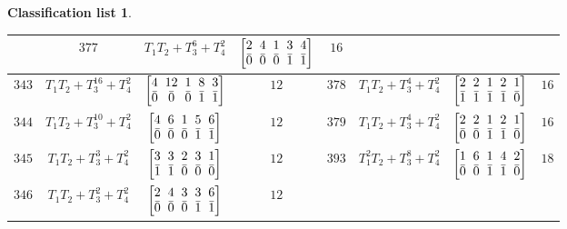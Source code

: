 \documentclass[pdftex]{sigma}%
\theoremstyle{definition}
\newtheorem{class-list}[thm]{Classification list}
\numberwithin{equation}{section}
\begin{document}
\begin{class-list}
\begin{table}[h!]
\begin{tabu}{c|c|c|c||c|c|c|c}
&${377}$&${T_{1}T_{2}+T_{3}^{6}+T_{4}^{2}}$
&$\arraycolsep=1mm\begin{bmatrix}{2} & {4} & {1} & {3} & {4} \\ {\bar{0}} & {\bar{0}} & {\bar{0}} & {\bar{1}} & {\bar{1}}\end{bmatrix}$&${16}$
\\
\hline
${343}$&${T_{1}T_{2}+T_{3}^{16}+T_{4}^{2}}$
&$\arraycolsep=1mm\begin{bmatrix}{4} & {12} & {1} & {8} & {3} \\ {\bar{0}} & {\bar{0}} & {\bar{0}} & {\bar{1}} & {\bar{1}}\end{bmatrix}$&${12}$
&${378}$&${T_{1}T_{2}+T_{3}^{4}+T_{4}^{2}}$
&$\arraycolsep=1mm\begin{bmatrix}{2} & {2} & {1} & {2} & {1} \\ {\bar{1}} & {\bar{1}} & {\bar{1}} & {\bar{1}} & {\bar{0}}\end{bmatrix}$&${16}$
\\
\hline
${344}$&${T_{1}T_{2}+T_{3}^{10}+T_{4}^{2}}$
&$\arraycolsep=1mm\begin{bmatrix}{4} & {6} & {1} & {5} & {6} \\ {\bar{0}} & {\bar{0}} & {\bar{0}} & {\bar{1}} & {\bar{1}}\end{bmatrix}$&${12}$
&${379}$&${T_{1}T_{2}+T_{3}^{4}+T_{4}^{2}}$
&$\arraycolsep=1mm\begin{bmatrix}{2} & {2} & {1} & {2} & {1} \\ {\bar{0}} & {\bar{0}} & {\bar{1}} & {\bar{1}} & {\bar{0}}\end{bmatrix}$&${16}$
\\
\hline
${345}$&${T_{1}T_{2}+T_{3}^{3}+T_{4}^{2}}$
&$\arraycolsep=1mm\begin{bmatrix}{3} & {3} & {2} & {3} & {1} \\ {\bar{1}} & {\bar{1}} & {\bar{0}} & {\bar{0}} & {\bar{0}}\end{bmatrix}$&${12}$
&${393}$&${T_{1}^{2}T_{2}+T_{3}^{8}+T_{4}^{2}}$
&$\arraycolsep=1mm\begin{bmatrix}{1} & {6} & {1} & {4} & {2} \\ {\bar{0}} & {\bar{0}} & {\bar{1}} & {\bar{1}} & {\bar{0}}\end{bmatrix}$&${18}$
\\
\hline
${346}$&${T_{1}T_{2}+T_{3}^{2}+T_{4}^{2}}$
&$\arraycolsep=1mm\begin{bmatrix}{2} & {4} & {3} & {3} & {6} \\ {\bar{0}} & {\bar{0}} & {\bar{0}} & {\bar{1}} & {\bar{1}}\end{bmatrix}$&${12}$

\end{tabu}
\end{table}
\end{class-list}
\end{document}
